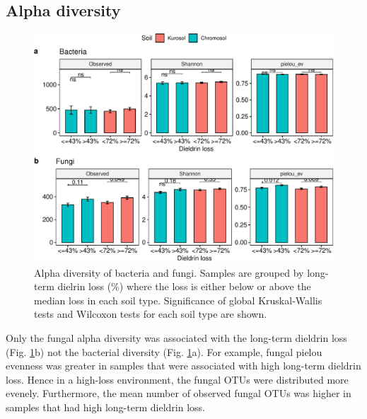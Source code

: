 \documentclass[
]{article}
\begin{document}
\hypertarget{alpha-diversity}{%
\subsection{Alpha diversity}\label{alpha-diversity}}

\begin{figure}
\centering
\includegraphics{M2_Results_files/figure-latex/alphadloss-1.pdf}
\caption{\label{fig:alphadloss}Alpha diversity of bacteria and fungi. Samples are grouped by long-term dielrin loss (\%) where the loss is either below or above the median loss in each soil type. Significance of global Kruskal-Wallis tests and Wilcoxon tests for each soil type are shown.}
\end{figure}

Only the fungal alpha diversity was associated with the long-term dieldrin loss (Fig. \ref{fig:alphadloss}b) not the bacterial diversity (Fig. \ref{fig:alphadloss}a). For example, fungal pielou evenness was greater in samples that were associated with high long-term dieldrin loss. Hence in a high-loss environment, the fungal OTUs were distributed more evenely. Furthermore, the mean number of observed fungal OTUs was higher in samples that had high long-term dieldrin loss.
\end{document}
